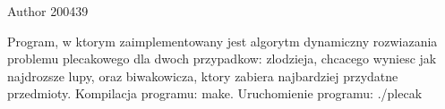 \begin{DoxyAuthor}{\-Author}
200439
\end{DoxyAuthor}
\-Program, w ktorym zaimplementowany jest algorytm dynamiczny rozwiazania problemu plecakowego dla dwoch przypadkow\-: zlodzieja, chcacego wyniesc jak najdrozsze lupy, oraz biwakowicza, ktory zabiera najbardziej przydatne przedmioty. \-Kompilacja programu\-: make. \-Uruchomienie programu\-: ./plecak 